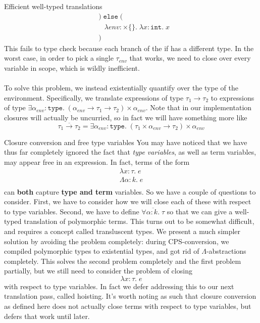 \documentclass{amsart}
\newcommand{\kwd}[1]{\ensuremath{\mathtt{#1}}}
\newcommand{\intt}{\ensuremath{\mathtt{int}}}
\begin{document}
\begin{section}{Efficient well-typed translations}
\begin{align*}
          & ) \; \kwd{else} \; ( \\
          & \; \; \; \lambda env : \times\{\}. \; \lambda x : \intt. \; x \\
          & )
        \end{align*}
    This fails to type check because each branch of the if has a different type. In the worst case, in order to pick a single $\tau_{env}$ that works, we need to close over every variable in scope, which is wildly inefficient. \\ \\
    To solve this problem, we instead existentially quantify over the type of the environment. Specifically, we translate expressions of type $\tau_1 \to \tau_2$ to expressions of type $\exists \alpha_{env} : \kwd{type}. \; (\alpha_{env} \to \tau_1 \to \tau_2) \times \alpha_{env}$. Note that in our implementation closures will actually be uncurried, so in fact we will have something more like
      \[
        \overline{\tau_1 \to \tau_2} = \exists \alpha_{env} : \kwd{type}. \; (\tau_1 \times \alpha_{env} \to \tau_2) \times \alpha_{env}
      \]
\end{section}
\begin{section}{Closure conversion and free type variables}
You may have noticed that we have thus far completely ignored the fact that {\it type variables}, as well as term variables, may appear free in an expression. In fact, terms of the form
  \[
    \begin{array}{l}
    \lambda x : \tau. \; e \\
    \Lambda \alpha : k. \; e \\
    \end{array}
  \]
can {\bf both} capture {\bf type and term} variables. So we have a couple of questions to consider. First, we have to consider how we will close each of these with respect to type variables. Second, we have to define $\overline{\forall \alpha : k. \; \tau}$ so that we can give a well-typed translation of polymorphic terms. This turns out to be somewhat difficult, and requires a concept called transluscent types. We present a much simpler solution by avoiding the problem completely: during CPS-conversion, we compiled polymorphic types to existential types, and got rid of $\Lambda$-abstractions completely. This solves the second problem completely and the first problem partially, but we still need to consider the problem of closing
  \[
    \lambda x : \tau. \; e
  \]
with respect to type variables. In fact we defer addressing this to our next translation pass, called hoisting. It's worth noting as such that closure conversion as defined here does not actually close terms with respect to type variables, but defers that work until later.
\end{section}
\end{document}
